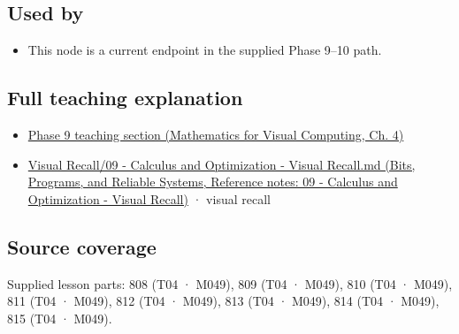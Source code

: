 \subsection{Used by}\label{appendix-d9f70bdfbc92-used-by}

\hypertarget{appendix-d9f70bdfbc92-used-by}{}

\begin{itemize}
\tightlist
\item
  This node is a current endpoint in the supplied Phase 9--10 path.
\end{itemize}

\subsection{Full teaching explanation}\label{appendix-d9f70bdfbc92-full-teaching-explanation}

\hypertarget{appendix-d9f70bdfbc92-full-teaching-explanation}{}

\begin{itemize}
\tightlist
\item
  \href{../02-Mathematics-for-Visual-Computing/main.pdf\#nameddest=01-foundations-i-ch020-functions-limits-continuity-and-scalar-change}{Phase 9 teaching section (Mathematics for Visual Computing, Ch. 4)}
\item
  \href{../01-Bits-Programs-and-Reliable-Systems/main.pdf\#nameddest=appendix-adf48f5dc5c1}{Visual Recall/09 - Calculus and Optimization - Visual Recall.md (Bits, Programs, and Reliable Systems, Reference notes: 09 - Calculus and Optimization - Visual Recall)} · visual recall
\end{itemize}

\subsection{Source coverage}\label{appendix-d9f70bdfbc92-source-coverage}

\hypertarget{appendix-d9f70bdfbc92-source-coverage}{}

Supplied lesson parts: 808 (T04 · M049), 809 (T04 · M049), 810 (T04 · M049), 811 (T04 · M049), 812 (T04 · M049), 813 (T04 · M049), 814 (T04 · M049), 815 (T04 · M049).
